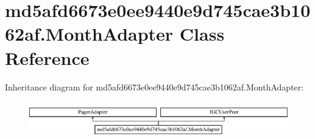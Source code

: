 \hypertarget{classmd5afd6673e0ee9440e9d745cae3b1062af_1_1MonthAdapter}{}\section{md5afd6673e0ee9440e9d745cae3b1062af.\+Month\+Adapter Class Reference}
\label{classmd5afd6673e0ee9440e9d745cae3b1062af_1_1MonthAdapter}
Inheritance diagram for md5afd6673e0ee9440e9d745cae3b1062af.\+Month\+Adapter\+:\begin{figure}[H]
\begin{center}
\leavevmode
\includegraphics[height=1.623188cm]{classmd5afd6673e0ee9440e9d745cae3b1062af_1_1MonthAdapter}
\end{center}
\end{figure}
